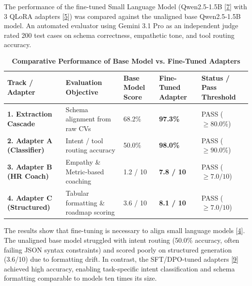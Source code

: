 \documentclass[12pt, a4paper]{report}
\begin{document}
\vspace{0.8cm}
\vspace{0.4cm}

The performance of the fine-tuned Small Language Model (Qwen2.5-1.5B [\hyperlink{cite7}{7}] with 3 QLoRA adapters [\hyperlink{cite5}{5}]) was compared against the unaligned base Qwen2.5-1.5B model. An automated evaluator using Gemini 3.1 Pro as an independent judge rated 200 test cases on schema correctness, empathetic tone, and tool routing accuracy.

\begin{table}[H]
    \centering
    \caption[Comparative Performance of Base Model vs. Fine-Tuned Adapters]{\textbf{Comparative Performance of Base Model vs. Fine-Tuned Adapters}}
    \vspace{0.2cm}
    \normalsize
    \renewcommand{\arraystretch}{1.3}
    \begin{tabularx}{\textwidth}{Z{0.9} | Z{1.1} | Z{0.75} | Z{0.9} | Z{1.35}}
    \hline\hline
    Track / Adapter & Evaluation Objective & Base Model Score & Fine-Tuned Adapter & Status / Pass Threshold \\
    \hline
    \textbf{1. Extraction Cascade} & Schema alignment from raw CVs & 68.2\% & \textbf{97.3\%} & PASS ($\ge 80.0\%$) \\
    \textbf{2. Adapter A (Classifier)} & Intent / tool routing accuracy & 50.0\% & \textbf{98.0\%} & PASS ($\ge 90.0\%$) \\
    \textbf{3. Adapter B (HR Coach)} & Empathy \& Metric-based coaching & 1.2 / 10 & \textbf{7.8 / 10} & PASS ($\ge 7.0 / 10$) \\
    \textbf{4. Adapter C (Structured)} & Tabular formatting \& roadmap scoring & 3.6 / 10 & \textbf{8.1 / 10} & PASS ($\ge 7.0 / 10$) \\
    \hline\hline
    \end{tabularx}
\end{table}

The results show that fine-tuning is necessary to align small language models [\hyperlink{cite4}{4}]. The unaligned base model struggled with intent routing (50.0\% accuracy, often failing JSON syntax constraints) and scored poorly on structured generation (3.6/10) due to formatting drift. In contrast, the SFT/DPO-tuned adapters [\hyperlink{cite9}{9}] achieved high accuracy, enabling task-specific intent classification and schema formatting comparable to models ten times its size.
\end{document}
